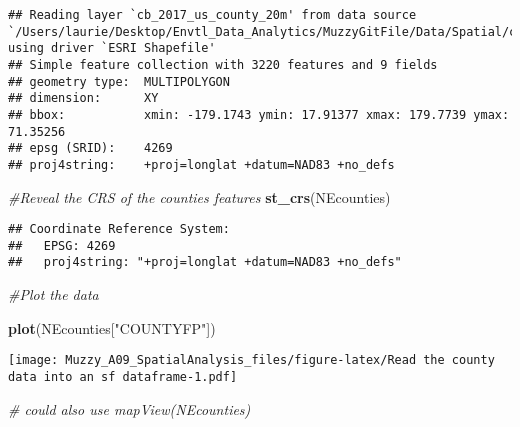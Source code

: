 \documentclass[]{article}
\newenvironment{Shaded}{\begin{snugshade}}{\end{snugshade}}
\newcommand{\KeywordTok}[1]{\textcolor[rgb]{0.13,0.29,0.53}{\textbf{#1}}}
\newcommand{\DecValTok}[1]{\textcolor[rgb]{0.00,0.00,0.81}{#1}}
\newcommand{\StringTok}[1]{\textcolor[rgb]{0.31,0.60,0.02}{#1}}
\newcommand{\CommentTok}[1]{\textcolor[rgb]{0.56,0.35,0.01}{\textit{#1}}}
\newcommand{\OperatorTok}[1]{\textcolor[rgb]{0.81,0.36,0.00}{\textbf{#1}}}
\newcommand{\NormalTok}[1]{#1}
\begin{document}
\begin{Shaded}
\end{Shaded}

\begin{verbatim}
## Reading layer `cb_2017_us_county_20m' from data source `/Users/laurie/Desktop/Envtl_Data_Analytics/MuzzyGitFile/Data/Spatial/cb_2017_us_county_20m.shp' using driver `ESRI Shapefile'
## Simple feature collection with 3220 features and 9 fields
## geometry type:  MULTIPOLYGON
## dimension:      XY
## bbox:           xmin: -179.1743 ymin: 17.91377 xmax: 179.7739 ymax: 71.35256
## epsg (SRID):    4269
## proj4string:    +proj=longlat +datum=NAD83 +no_defs
\end{verbatim}

\begin{Shaded}
\begin{Highlighting}[]
\CommentTok{#Reveal the CRS of the counties features}
\KeywordTok{st_crs}\NormalTok{(NEcounties)}
\end{Highlighting}
\end{Shaded}

\begin{verbatim}
## Coordinate Reference System:
##   EPSG: 4269 
##   proj4string: "+proj=longlat +datum=NAD83 +no_defs"
\end{verbatim}

\begin{Shaded}
\begin{Highlighting}[]
\CommentTok{#Plot the data}

\KeywordTok{plot}\NormalTok{(NEcounties[}\StringTok{"COUNTYFP"}\NormalTok{])}
\end{Highlighting}
\end{Shaded}

\texttt{[image: Muzzy\_A09\_SpatialAnalysis\_files/figure-latex/Read the county data into an sf dataframe-1.pdf]}

\begin{Shaded}
\begin{Highlighting}[]
\CommentTok{# could also use mapView(NEcounties)}
\end{Highlighting}
\end{Shaded}
\end{document}
